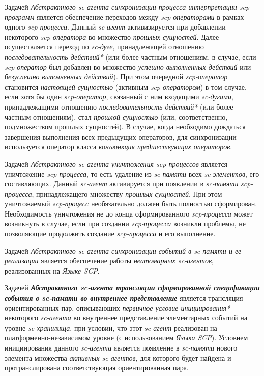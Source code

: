 Задачей \textit{Абстрактного sc-агента синхронизации процесса интерпретации scp-программ} является обеспечение переходов между \textit{scp-операторами} в рамках одного \textit{scp-процесса}. Данный \textit{sc-агент} активизируется при добавлении некоторого \textit{scp-оператора} во множество \textit{прошлых сущностей}. Далее осуществляется переход по \textit{sc-дуге}, принадлежащей отношению \textit{последовательность действий*} (или более частным отношениям, в случае, если \textit{\mbox{scp-оператор}} был добавлен во множество \textit{успешно выполненных действий} или \textit{безуспешно выполненных действий}). При этом очередной \textit{scp-оператор} становится \textit{настоящей сущностью} (активным \textit{scp-оператором}) в том случае, если хотя бы один \textit{scp-оператор}, связанный с ним входящими \textit{sc-дугами}, принадлежащими отношению \textit{последовательность действий*} (или более частным отношениям), стал \textit{прошлой сущностью} (или, соответственно, подмножеством прошлых сущностей). В случае, когда необходимо дождаться завершения выполнения всех предыдущих операторов, для синхронизации используется оператор класса \textit{конъюнкция предшествующих операторов}.

Задачей \textit{Абстрактного sc-агента уничтожения scp-процессов} является уничтожение \textit{scp-процесса}, то есть удаление из \textit{sc-памяти} всех \textit{sc-элементов}, его составляющих. Данный \textit{sc-агент} активируется при появлении в \textit{sc-памяти} \textit{scp-процесса}, принадлежащего множеству \textit{прошлых сущностей}.
При этом уничтожаемый \textit{scp-процесс} необязательно должен быть полностью сформирован. Необходимость уничтожения не до конца сформированного \textit{scp-процесса} может возникнуть в случае, если при создании \textit{scp-процесса} возникли проблемы, не позволяющие продолжить создание \textit{scp-процесса} и его выполнение.

Задачей \textit{Абстрактного sc-агента синхронизации событий в sc-памяти и ее реализации} является обеспечение работы \textit{неатомарных sc-агентов}, реализованных на \textit{Языке SCP}.

Задачей \textit{\textbf{Абстрактного sc-агента трансляции сформированной спецификации события в sc-памяти во внутреннее представление}} является трансляция ориентированных пар, описывающих \textit{первичное условие инициирования*} некоторого \textit{\mbox{sc-агента}} во внутреннее представление элементарных событий на уровне \textit{\mbox{sc-хранилища}}, при условии, что этот \textit{sc-агент} реализован на платформенно-независимом уровне (с использованием \textit{Языка SCP}). Условием инициирования данного \textit{sc-агента} является появление в \textit{\mbox{sc-памяти}} нового элемента множества \textit{активных sc-агентов}, для которого будет найдена и протранслирована соответствующая ориентированная пара.


